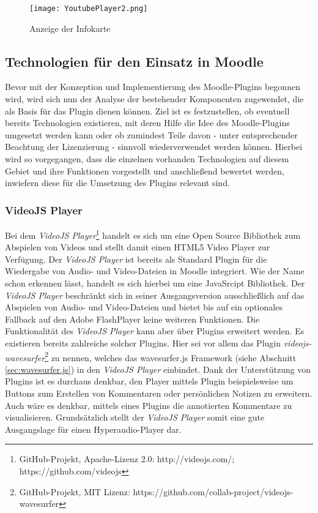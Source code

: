 \begin{figure}[h!]
\texttt{[image: YoutubePlayer2.png]}
\caption{\label{fig:YoutubePlayer2}Anzeige der Infokarte \citep{Youtube2015Panic}}
\end{figure}


\subsection{Technologien für den Einsatz in Moodle}
Bevor mit der Konzeption und Implementierung des Moodle-Plugins begonnen wird, wird sich nun der Analyse der bestehender Komponenten zugewendet, die als Basis für das Plugin dienen können. Ziel ist es festzustellen, ob eventuell bereits Technologien existieren, mit deren Hilfe die Idee des Moodle-Plugins umgesetzt werden kann oder ob zumindest Teile davon - unter entsprechender Beachtung der Lizenzierung - sinnvoll wiederverwendet werden können. Hierbei wird so vorgegangen, dass die einzelnen vorhanden Technologien auf diesem Gebiet und ihre Funktionen vorgestellt und anschließend bewertet werden, inwiefern diese für die Umsetzung des Plugins relevant sind.


\subsubsection{VideoJS Player}
Bei dem \textit{VideoJS Player}\footnote{GitHub-Projekt, Apache-Lizenz 2.0: http://videojs.com/; https://github.com/videojs} handelt es sich um eine Open Source Bibliothek zum Abspielen von Videos und stellt damit einen HTML5 Video Player zur Verfügung. Der \textit{VideoJS Player} ist bereits als Standard Plugin für die Wiedergabe von Audio- und Video-Dateien in Moodle integriert. Wie der Name schon erkennen lässt, handelt es sich hierbei um eine JavaSrcipt Bibliothek. Der \textit{VideoJS Player} beschränkt sich in seiner Ausgangsversion ausschließlich auf das Abspielen von Audio- und Video-Dateien und bietet bis auf ein optionales Fallback auf den Adobe FlashPlayer keine weiteren Funktionen. Die Funktionalität des \textit{VideoJS Player} kann aber über Plugins erweitert werden. Es existieren bereits zahlreiche solcher Plugins. Hier sei vor allem das Plugin \textit{videojs-wavesurfer}\footnote{GitHub-Projekt, MIT Lizenz: https://github.com/collab-project/videojs-wavesurfer} zu nennen, welches das wavesurfer.js Framework (siehe Abschnitt \ref{sec:wavesurfer.js}) in den \textit{VideoJS Player} einbindet. Dank der Unterstützung von Plugins ist es durchaus denkbar, den Player mittels Plugin beispielsweise um Buttons zum Erstellen von Kommentaren oder persönlichen Notizen zu erweitern. Auch wäre es denkbar, mittels eines Plugins die annotierten Kommentare zu visualisieren. Grundsätzlich stellt der \textit{VideoJS Player} somit eine gute Ausgangslage für einen Hyperaudio-Player dar.

